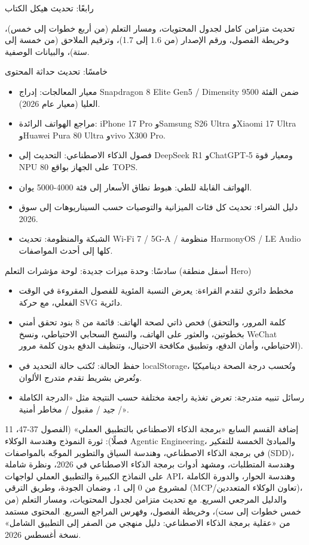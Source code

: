 رابعًا: تحديث هيكل الكتاب

تحديث متزامن كامل لجدول المحتويات، ومسار التعلم (من أربع خطوات إلى خمس)، وخريطة الفصول، ورقم الإصدار (من 1.6 إلى 1.7)، وترقيم الملاحق (من خمسة إلى ستة)، والبيانات الوصفية.

خامسًا: تحديث حداثة المحتوى

\begin{itemize}
  \item معيار المعالجات: إدراج Snapdragon 8 Elite Gen5 / Dimensity 9500 ضمن الفئة العليا (معيار عام 2026).
  \item مراجع الهواتف الرائدة: iPhone 17 Pro وSamsung S26 Ultra وXiaomi 17 Ultra وHuawei Pura 80 Ultra وvivo X300 Pro.
  \item فصول الذكاء الاصطناعي: التحديث إلى DeepSeek R1 وChatGPT-5 ومعيار قوة NPU على الجهاز بواقع 80 TOPS.
  \item الهواتف القابلة للطي: هبوط نطاق الأسعار إلى فئة 4000-5000 يوان.
  \item دليل الشراء: تحديث كل فئات الميزانية والتوصيات حسب السيناريوهات إلى سوق 2026.
  \item الشبكة والمنظومة: تحديث Wi-Fi 7 / 5G-A / منظومة HarmonyOS / LE Audio كلها إلى أحدث المواصفات.
\end{itemize}

سادسًا: وحدة ميزات جديدة: لوحة مؤشرات التعلم (أسفل منطقة Hero)

\begin{itemize}
  \item مخطط دائري لتقدم القراءة: يعرض النسبة المئوية للفصول المقروءة في الوقت الفعلي، مع حركة SVG دائرية.
  \item فحص ذاتي لصحة الهاتف: قائمة من 8 بنود تحقق أمني (كلمة المرور، والتحقق بخطوتين، والعثور على الهاتف، والنسخ السحابي الاحتياطي، ونسخ WeChat الاحتياطي، وأمان الدفع، وتطبيق مكافحة الاحتيال، وتنظيف الدفع بدون كلمة مرور).
  \item حفظ الحالة: تُكتب حالة التحديد في localStorage، وتُحسب درجة الصحة ديناميكيًا وتُعرض بشريط تقدم متدرج الألوان.
  \item رسائل تنبيه متدرجة: تعرض تغذية راجعة مختلفة حسب النتيجة مثل «الدرجة الكاملة / جيد / مقبول / مخاطر أمنية».
\end{itemize}


إضافة القسم السابع «برمجة الذكاء الاصطناعي بالتطبيق العملي» (الفصول 37-47، 11 فصلًا): ثورة النموذج وهندسة الوكلاء Agentic Engineering، والمبادئ الخمسة للتفكير في برمجة الذكاء الاصطناعي، وهندسة السياق والتطوير الموجّه بالمواصفات (SDD)، وهندسة المتطلبات، ومشهد أدوات برمجة الذكاء الاصطناعي في 2026، ونظرة شاملة على النماذج الكبيرة والتطبيق العملي لواجهات API، وهندسة الحوار، والدورة الكاملة لمشروع من 0 إلى 1، وضمان الجودة، وطريق الترقي (MCP/تعاون الوكلاء المتعددين)، والدليل المرجعي السريع. مع تحديث متزامن لجدول المحتويات، ومسار التعلم (من خمس خطوات إلى ست)، وخريطة الفصول، وفهرس المراجع السريع. المحتوى مستمد من «عقلية برمجة الذكاء الاصطناعي: دليل منهجي من الصفر إلى التطبيق الشامل» نسخة أغسطس 2026.

